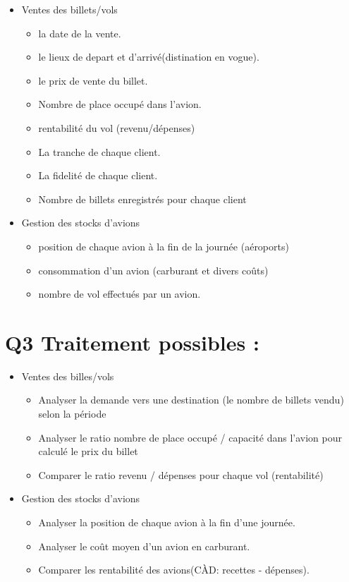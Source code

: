 \documentclass[oneside,13pt,a4paper]{article}
\begin{document}
\begin{itemize}
  \item Ventes des billets/vols
        \begin{itemize}
          \item la date de la vente.
          \item le lieux de depart et d'arrivé(distination en vogue).
          \item le prix de vente du billet.
          \item Nombre de place occupé dans l'avion.
          \item rentabilité du vol (revenu/dépenses)
          \item La tranche de chaque client. 
          \item La fidelité de chaque client.
          \item Nombre de billets enregistrés pour chaque client 
        \end{itemize}
\end{itemize}
\begin{itemize}
  \item Gestion des stocks d'avions
        \begin{itemize}
          \item position de chaque avion à la fin de la journée (aéroports)
          \item consommation d'un avion (carburant et divers coûts)
          \item nombre de vol effectués par un avion.
        \end{itemize}
\end{itemize}

\section{Q3 Traitement possibles : }

\begin{itemize}
  \item Ventes des billes/vols
        \begin{itemize}
          \item Analyser la demande vers une destination (le nombre de billets vendu) selon la période
          \item Analyser le ratio nombre de place occupé / capacité dans l'avion pour calculé le prix du billet
          \item Comparer le ratio revenu / dépenses pour chaque vol (rentabilité)
        \end{itemize}
\end{itemize}
\begin{itemize}
  \item Gestion des stocks d'avions
        \begin{itemize}
          \item Analyser la position de chaque avion à la fin d'une journée.
          \item Analyser le coût moyen d'un avion en carburant.
          \item Comparer les rentabilité des avions(CÀD: recettes - dépenses).
        \end{itemize}
\end{itemize}
\end{document}
